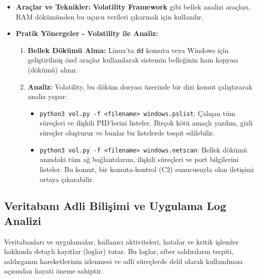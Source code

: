 \begin{itemize}
\begin{itemize}
    \item \textbf{Araçlar ve Teknikler:} \textbf{Volatility Framework} gibi bellek analizi araçları, RAM dökümünden bu uçucu verileri çıkarmak için kullanılır.
    \item \textbf{Pratik Yönergeler - Volatility ile Analiz:}
    \begin{enumerate}
        \item \textbf{Bellek Dökümü Alma:} Linux'ta \texttt{dd} komutu veya Windows için geliştirilmiş özel araçlar kullanılarak sistemin belleğinin ham kopyası (dökümü) alınır.
        \item \textbf{Analiz:} Volatility, bu döküm dosyası üzerinde bir dizi komut çalıştırarak analiz yapar:
        \begin{itemize}
            \item \texttt{python3 vol.py -f \textless{}filename\textgreater{} windows.pslist}: Çalışan tüm süreçleri ve ilişkili PID'lerini listeler. Birçok kötü amaçlı yazılım, gizli süreçler oluşturur ve bunlar bu listelerde tespit edilebilir.
            \item \texttt{python3 vol.py -f \textless{}filename\textgreater{} windows.netscan}: Bellek dökümü anındaki tüm ağ bağlantılarını, ilişkili süreçleri ve port bilgilerini listeler. Bu komut, bir komuta-kontrol (C2) sunucusuyla olan iletişimi ortaya çıkarabilir.
        \end{itemize}
    \end{enumerate}
\end{itemize}

\subsection{Veritabanı Adli Bilişimi ve Uygulama Log Analizi}

Veritabanları ve uygulamalar, kullanıcı aktiviteleri, hatalar ve kritik işlemler hakkında detaylı kayıtlar (loglar) tutar. Bu loglar, siber saldırıların tespiti, saldırganın hareketlerinin izlenmesi ve adli süreçlerde delil olarak kullanılması açısından hayati öneme sahiptir.


\end{itemize}
